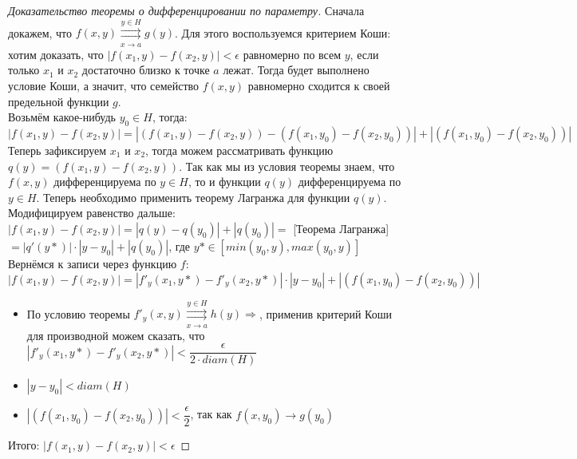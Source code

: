 \begin{proof}[Доказательство теоремы о дифференцировании по параметру]
   Сначала докажем, что $f(x, y) \overset{y \in H}{\underset{x \to a}{\rightrightarrows}} g(y)$. Для
   этого воспользуемся критерием Коши: хотим доказать, что $|f(x_1, y) - f(x_2, y)| < \epsilon$
   равномерно по всем $y$, если только $x_1$ и $x_2$ достаточно близко к точке $a$ лежат. Тогда будет
   выполнено условие Коши, а значит, что семейство $f(x, y)$ равномерно сходится к своей предельной
   функции $g$. \\
   Возьмём какое-нибудь $y_0 \in H$, тогда: \\
   $|f(x_1, y) - f(x_2, y)| = |(f(x_1, y) - f(x_2, y)) - (f(x_1, y_0) - f(x_2, y_0))| +
   |(f(x_1, y_0) - f(x_2, y_0))|$ \\
   Теперь зафиксируем $x_1$ и $x_2$, тогда можем рассматривать функцию $q(y) = (f(x_1, y) - f(x_2, y))$.
   Так как мы из условия теоремы знаем, что $f(x,y)$ дифференцируема по $y \in H$, то и 
   функции $q(y)$ дифференцируема по $y \in H$. Теперь необходимо применить теорему Лагранжа
   для функции $q(y)$. Модифицируем равенство дальше: \\
   $|f(x_1, y) - f(x_2, y)| = |q(y) - q(y_0)| +
   |q(y_0)| =$ [Теорема Лагранжа] $= |q'(y*)| \cdot |y - y_0| + |q(y_0)|$, где
   $y* \in [min(y_0, y), max(y_0, y)]$ \\
   Вернёмся к записи через функцию $f$: \\
   $|f(x_1, y) - f(x_2, y)|  = |f'_y(x_1, y*) - f'_y(x_2, y*)|\cdot |y - y_0| +|(f(x_1, y_0) - f(x_2, y_0))| $ \\[9.5pt]
   \begin{itemize}
       \item По условию теоремы $f'_y(x, y) \overset{y \in H}{\underset{x \to a}{\rightrightarrows}} h(y) \Rightarrow$,
   применив критерий Коши для производной можем сказать, что $|f'_y(x_1, y*) - f'_y(x_2, y*)|
   < \dfrac{\epsilon}{2 \cdot diam(H)}$
        \item $|y - y_0| < diam(H)$
        \item $|(f(x_1, y_0) - f(x_2, y_0))| < \dfrac{\epsilon}{2}$, так как
        $f(x, y_0) \to g(y_0)$  
    \end{itemize}
    Итого: $|f(x_1, y) - f(x_2, y)| < \epsilon$


\end{proof}
